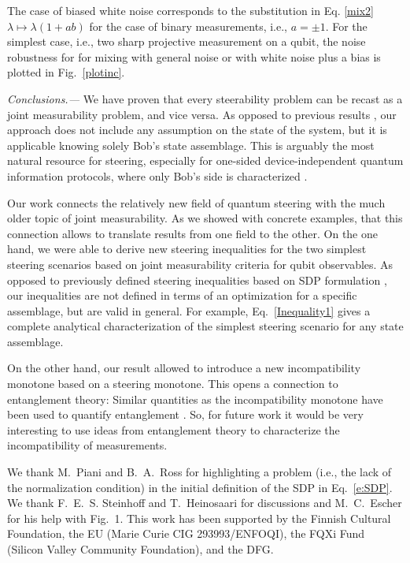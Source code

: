 \documentclass[10pt,twocolumn,aps,prl,nobibnotes,showpacs,superscriptaddress,floatfix]{revtex4-1}
\theoremstyle{definition}
\begin{document}
The case of biased white noise corresponds to the substitution in Eq. \ref{mix2} $\lambda \mapsto \lambda(1+ab)$ for the case of binary measurements, i.e., $a=\pm 1$.
For the simplest case, i.e., two sharp projective measurement on a qubit, the noise robustness for  for mixing with general noise or with white noise plus a bias is plotted in Fig.~\ref{plotinc}.

{\it Conclusions.---} 
We have proven that every steerability problem can be recast as a joint measurability problem, and vice versa. As opposed to previous results \cite{Uola14, Quint14}, our approach does not include any assumption on the state of the system, but it is applicable knowing solely  Bob's state assemblage. This is arguably 
the most natural resource for steering, especially for  
one-sided device-independent quantum information protocols, 
where only Bob's side is characterized \cite{Gallego14}.

Our work connects the relatively new field of quantum steering 
with the much older topic of joint measurability. As we showed 
with concrete examples, that this connection allows to translate 
results from one field to the other. On the one hand, we were able 
to derive new steering inequalities for the two simplest steering 
scenarios based on joint measurability criteria for qubit observables. 
As opposed to previously defined steering inequalities based on SDP 
formulation \cite{Piani15,SNC14}, our inequalities are not defined 
in terms of an optimization for a specific assemblage, but are 
valid in general. For example, Eq.~\eqref{Inequality1} gives a 
complete analytical characterization of the simplest steering 
scenario for any state assemblage.

On the other hand, our result allowed to introduce a new 
incompatibility monotone based on a steering monotone. 
This opens a connection to entanglement theory: Similar
quantities as the incompatibility monotone 
have been used to quantify entanglement \cite{vidal1999,brandao2005,cavalcanti2006}. 
So, for future work it would be very interesting to use ideas 
from entanglement theory to characterize the incompatibility of 
measurements.

We thank M.~Piani and B.~A.~Ross for highlighting a problem (i.e., the lack of the normalization condition) in the initial definition of the SDP in Eq.~\eqref{e:SDP}. We thank F.~E.~S. Steinhoff and T.~Heinosaari for discussions and M.~C.~Escher for his help with 
Fig.~1. This work has been supported by the Finnish Cultural Foundation, the
EU (Marie Curie CIG 293993/ENFOQI), the FQXi Fund (Silicon Valley Community Foundation), and the DFG.
\end{document}
